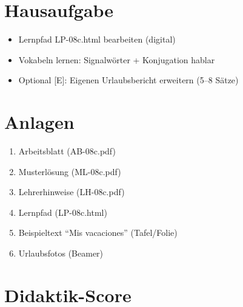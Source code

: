 \documentclass[11pt,a4paper]{article}
\begin{document}
\section{Hausaufgabe}

\begin{itemize}
    \item Lernpfad LP-08c.html bearbeiten (digital)
    \item Vokabeln lernen: Signalwörter + Konjugation hablar
    \item Optional [E]: Eigenen Urlaubsbericht erweitern (5--8 Sätze)
\end{itemize}

\section{Anlagen}

\begin{enumerate}
    \item Arbeitsblatt (AB-08c.pdf)
    \item Musterlösung (ML-08c.pdf)
    \item Lehrerhinweise (LH-08c.pdf)
    \item Lernpfad (LP-08c.html)
    \item Beispieltext ``Mis vacaciones'' (Tafel/Folie)
    \item Urlaubsfotos (Beamer)
\end{enumerate}

\newpage
\section{Didaktik-Score}
\end{document}
